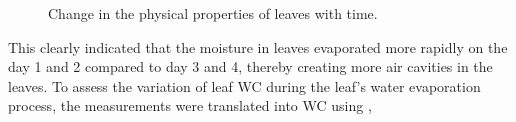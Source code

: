 \documentclass[journal,article,submit,moreauthors,pdftex]{Definitions/mdpi}
\renewcommand{\^}{\hat}  %
\begin{document}
\begin{figure}[h!]
	\centering
	\hfill
	\caption{Change in the physical properties of leaves with time.}
	\label{fig:measurements}
\end{figure}
%
This clearly indicated that the moisture in leaves evaporated more rapidly on the day 1 and 2 compared to day 3 and 4, thereby creating more air cavities in the leaves. To assess the variation of leaf WC during the leaf's water evaporation process, the measurements were translated into WC using \cite{Nie2017,Cao2015},
\end{document}

